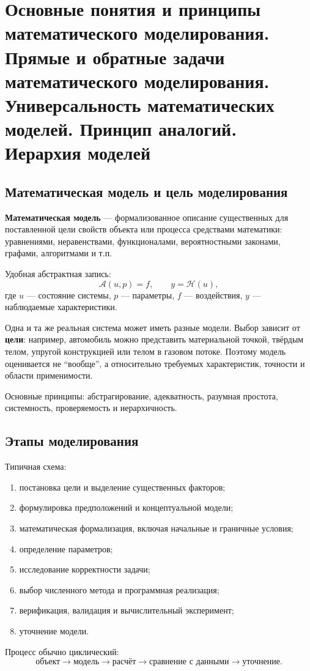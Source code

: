 \section{Основные понятия и принципы математического моделирования. Прямые и обратные задачи математического моделирования. Универсальность математических моделей. Принцип аналогий. Иерархия моделей}

\subsection{Математическая модель и цель моделирования}

\textbf{Математическая модель} --- формализованное описание существенных для поставленной цели свойств объекта или процесса средствами математики: уравнениями, неравенствами, функционалами, вероятностными законами, графами, алгоритмами и т.п.

Удобная абстрактная запись:
\[
\mathcal A(u,p)=f,
\qquad y=\mathcal H(u),
\]
где $u$ --- состояние системы, $p$ --- параметры, $f$ --- воздействия, $y$ --- наблюдаемые характеристики.

Одна и та же реальная система может иметь разные модели. Выбор зависит от \textbf{цели}: например, автомобиль можно представить материальной точкой, твёрдым телом, упругой конструкцией или телом в газовом потоке. Поэтому модель оценивается не ``вообще'', а относительно требуемых характеристик, точности и области применимости.

Основные принципы: абстрагирование, адекватность, разумная простота, системность, проверяемость и иерархичность.

\subsection{Этапы моделирования}

Типичная схема:
\begin{enumerate}
\item постановка цели и выделение существенных факторов;
\item формулировка предположений и концептуальной модели;
\item математическая формализация, включая начальные и граничные условия;
\item определение параметров;
\item исследование корректности задачи;
\item выбор численного метода и программная реализация;
\item верификация, валидация и вычислительный эксперимент;
\item уточнение модели.
\end{enumerate}
Процесс обычно циклический:
\[
\text{объект}\rightarrow\text{модель}\rightarrow\text{расчёт}
\rightarrow\text{сравнение с данными}\rightarrow\text{уточнение}.
\]

